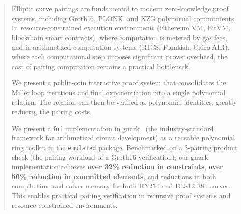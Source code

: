 \begin{abstract}
Elliptic curve pairings are fundamental to modern zero-knowledge proof systems, including Groth16, PLONK, and KZG polynomial commitments. In resource-constrained execution environments (Ethereum VM, BitVM, blockchain smart contracts), where computation is metered by gas fees, and in arithmetized computation systems (R1CS, Plonkish, Cairo AIR), where each computational step imposes significant prover overhead, the cost of pairing computation remains a practical bottleneck.

We present a public-coin interactive proof system that consolidates the Miller loop iterations and final exponentiation into a single polynomial relation. The relation can then be verified as polynomial identities, greatly reducing the pairing costs.

We present a full implementation in gnark~\cite{gnark} (the industry-standard framework for arithmetized circuit development) as a reusable polynomial ring toolkit in the \texttt{emulated} package. Benchmarked on a 3-pairing product check (the pairing workload of a Groth16 verification), our gnark implementation achieves \textbf{over 32\% reduction in constraints}, \textbf{over 50\% reduction in committed elements}, and reductions in both compile-time and solver memory for both BN254 and BLS12-381 curves. This enables practical pairing verification in recursive proof systems and resource-constrained environments.
\end{abstract}